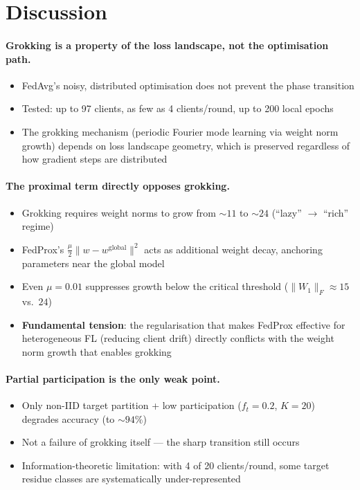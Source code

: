 \documentclass[11pt,a4paper]{article}
\begin{document}
\section{Discussion}

\paragraph{Grokking is a property of the loss landscape, not the optimisation path.}
\begin{itemize}
  \item FedAvg's noisy, distributed optimisation does not prevent the phase transition
  \item Tested: up to 97 clients, as few as 4 clients/round, up to 200 local epochs
  \item The grokking mechanism (periodic Fourier mode learning via weight norm growth) depends on loss landscape geometry, which is preserved regardless of how gradient steps are distributed
\end{itemize}

\paragraph{The proximal term directly opposes grokking.}
\begin{itemize}
  \item Grokking requires weight norms to grow from ${\sim}11$ to ${\sim}24$ (``lazy'' $\to$ ``rich'' regime)
  \item FedProx's $\frac{\mu}{2}\|w - w^{\mathrm{global}}\|^2$ acts as additional weight decay, anchoring parameters near the global model
  \item Even $\mu{=}0.01$ suppresses growth below the critical threshold ($\|W_1\|_F \approx 15$ vs.\ $24$)
  \item \textbf{Fundamental tension}: the regularisation that makes FedProx effective for heterogeneous FL (reducing client drift) directly conflicts with the weight norm growth that enables grokking
\end{itemize}

\paragraph{Partial participation is the only weak point.}
\begin{itemize}
  \item Only non-IID target partition + low participation ($f_t{=}0.2$, $K{=}20$) degrades accuracy (to ${\sim}94\%$)
  \item Not a failure of grokking itself --- the sharp transition still occurs
  \item Information-theoretic limitation: with 4 of 20 clients/round, some target residue classes are systematically under-represented
\end{itemize}
\end{document}
